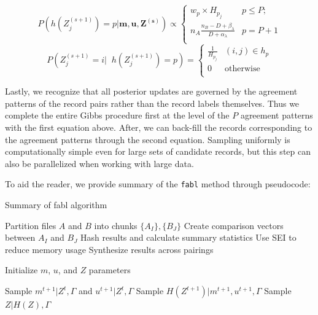 \documentclass[12pt,letterpaper]{article}
\newcommand{\1}[1]{\mathbb{I}\!\left[#1\right]} %
\begin{document}
\[P\left(h\left(Z_j^{(s+1)}\right) = p | \mathbf{m}, \mathbf{u}, \mathbf{Z^{(s)}}\right) \propto
\begin{cases} 
	w_{p}\times H_{p_j}  & p \leq P; \\
	n_A \frac{n_B - D + \beta_{\lambda}}{D + \alpha_{\lambda}} &   p = P + 1 \\
\end{cases}\]
\[P\left(Z_j^{(s+1)} = i\bigg|\;\; h\left(Z_j^{(s+1)}\right) = p\right) = \begin{cases} 
	\frac{1}{H_{p_j}} & (i, j) \in h_p \\
	0 & \text{otherwise} \\
\end{cases}\]

Lastly, we recognize that all posterior updates are governed by the
agreement patterns of the record pairs rather than the record labels
themselves. Thus we complete the entire Gibbs procedure first at the
level of the \(P\) agreement patterns with the first equation above.
After, we can back-fill the records corresponding to the agreement
patterns through the second equation. Sampling uniformly is
computationally simple even for large sets of candidate records, but this
step can also be parallelized when working with large data.

To aid the reader, we provide summary of the \texttt{fabl} method through pseudocode:

\begin{algorithm}
	\caption{Summary of fabl algorithm}
	\begin{algorithmic}[1]
		
		\State Partition files $A$ and $B$ into chunks $\{A_I\}, \{B_J\}$
		\State Create comparison vectors between $A_I$ and $B_J$
		\State Hash results and calculate summary statistics
		\State Use SEI to reduce memory usage
		\EndFor
		\State Synthesize results across pairings
		\EndProcedure
		
		\State Initialize $m$, $u$, and $Z$ parameters
		
		\State Sample $m^{t+1}|Z^{t}, \Gamma$ and  $u^{t+1}|Z^{t}, \Gamma$ 
		\State Sample $H\left(Z^{t+1}\right)|m^{t+1}, u^{t+1}, \Gamma$  
		\EndFor
		\State Sample $Z | H(Z), \Gamma$ 

		\EndProcedure
		
	\end{algorithmic}
\end{algorithm}
\end{document}

